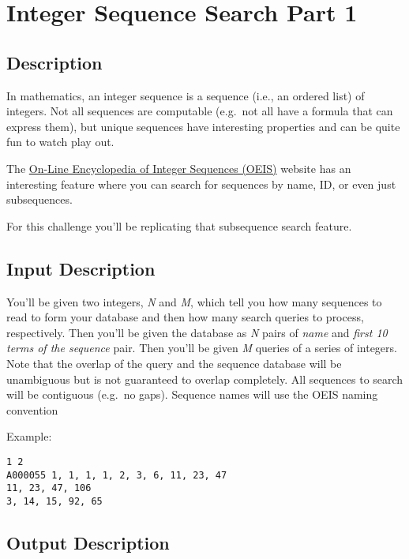 \section{Integer Sequence Search Part 1}

\subsection*{Description}\label{description-28}

In mathematics, an integer sequence is a sequence (i.e., an ordered
list) of integers. Not all sequences are computable (e.g.~not all have a
formula that can express them), but unique sequences have interesting
properties and can be quite fun to watch play out.

The \href{https://oeis.org/}{On-Line Encyclopedia of Integer Sequences
(OEIS)} website has an interesting feature where you can search for
sequences by name, ID, or even just subsequences.

For this challenge you'll be replicating that subsequence search
feature.

\subsection*{Input Description}\label{input-description-20}

You'll be given two integers, \emph{N} and \emph{M}, which tell you how
many sequences to read to form your database and then how many search
queries to process, respectively. Then you'll be given the database as
\emph{N} pairs of \emph{name} and \emph{first 10 terms of the sequence}
pair. Then you'll be given \emph{M} queries of a series of integers.
Note that the overlap of the query and the sequence database will be
unambiguous but is not guaranteed to overlap completely. All sequences
to search will be contiguous (e.g.~no gaps). Sequence names will use the
OEIS naming convention

Example:

\begin{lstlisting}
1 2
A000055 1, 1, 1, 1, 2, 3, 6, 11, 23, 47
11, 23, 47, 106
3, 14, 15, 92, 65
\end{lstlisting}

\subsection*{Output Description}\label{output-description-21}

